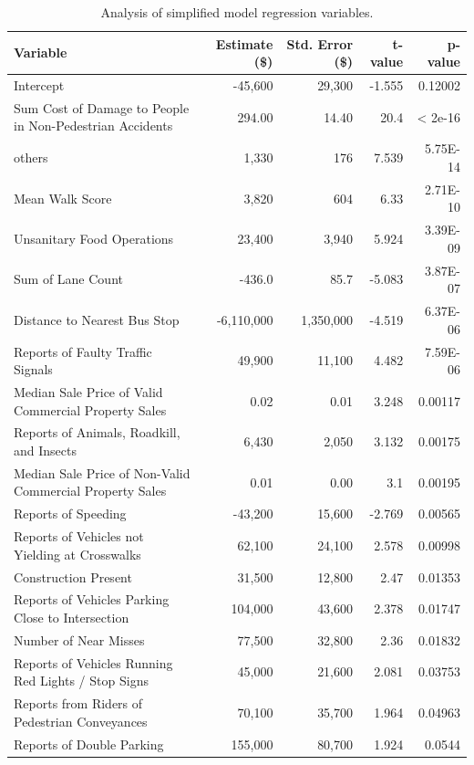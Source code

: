 \documentclass{llncs}
\begin{document}
\begin{table}[!h]
\begin{center}
\caption{Analysis of simplified model regression variables.}
\label{table:RegressionAnalysis}
\begin{tabular}{lrrrr}
\hline
\rule{0pt}{12pt}
Variable
& Estimate (\$)
& Std. Error (\$)
& t-value
& p-value\\[2pt]
\hline
Intercept&-45,600&29,300&-1.555&0.12002\\
Sum Cost of Damage to People in Non-Pedestrian Accidents&294.00&14.40&20.4&< 2e-16\\
others&1,330&176&7.539&5.75E-14\\
Mean Walk Score&3,820&604&6.33&2.71E-10\\
Unsanitary Food Operations&23,400&3,940&5.924&3.39E-09\\
Sum of Lane Count&-436.0&85.7&-5.083&3.87E-07\\
Distance to Nearest Bus Stop&-6,110,000&1,350,000&-4.519&6.37E-06\\
Reports of Faulty Traffic Signals&49,900&11,100&4.482&7.59E-06\\
Median Sale Price of Valid Commercial Property Sales&0.02&0.01&3.248&0.00117\\
Reports of Animals, Roadkill, and Insects&6,430&2,050&3.132&0.00175\\
Median Sale Price of Non-Valid Commercial Property Sales&0.01&0.00&3.1&0.00195\\
Reports of Speeding&-43,200&15,600&-2.769&0.00565\\
Reports of Vehicles not Yielding at Crosswalks&62,100&24,100&2.578&0.00998\\
Construction Present&31,500&12,800&2.47&0.01353\\
Reports of Vehicles Parking Close to Intersection&104,000&43,600&2.378&0.01747\\
Number of Near Misses&77,500&32,800&2.36&0.01832\\
Reports of Vehicles Running Red Lights / Stop Signs&45,000&21,600&2.081&0.03753\\
Reports from Riders of Pedestrian Conveyances&70,100&35,700&1.964&0.04963\\
Reports of Double Parking&155,000&80,700&1.924&0.0544\\
[2pt]
\hline
\end{tabular}
\end{center}
\end{table}
\FloatBarrier
\end{document}
